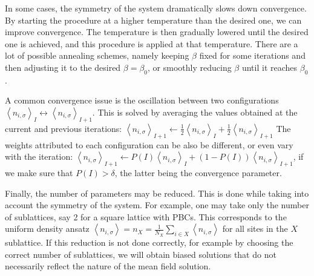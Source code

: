 In some cases, the symmetry of the system dramatically slows down convergence.
By starting the procedure at a higher temperature than the desired one, we can improve convergence.
The temperature is then gradually lowered until the desired one is achieved, and this procedure is applied at that temperature.
There are a lot of possible annealing schemes, namely keeping $\beta$ fixed for some iterations and then adjusting it to the desired $\beta = \beta_0$, or smoothly reducing $\beta$ until it reaches $\beta_0$.

A common convergence issue is the oscillation between two configurations $\left\langle n_{i,\sigma}\right\rangle_I \leftrightarrow \left\langle n_{i,\sigma}\right\rangle_{I+1}$.
This is solved by averaging the values obtained at the current and previous iterations: $\left\langle n_{i,\sigma}\right\rangle_{I+1} \leftarrow \frac{1}{2} \left\langle n_{i,\sigma}\right\rangle_I + \frac{1}{2} \left\langle n_{i,\sigma}\right\rangle_{I+1}$
The weights attributed to each configuration can be also be different, or even vary with the iteration: $\left\langle n_{i,\sigma}\right\rangle_{I+1} \leftarrow P(I) \left\langle n_{i,\sigma}\right\rangle_I + (1 - P(I) ) \left\langle n_{i,\sigma}\right\rangle_{I+1}$, if we make sure that $P(I) > \delta$, the latter being the convergence parameter.

Finally, the number of parameters may be reduced.
This is done while taking into account the symmetry of the system.
For example, one may take only the number of sublattices, say 2 for a square lattice with \acp{PBC}.
This corresponds to the uniform density ansatz $\left\langle n_{i,\sigma} \right\rangle = n_X = \frac{1}{N_X} \sum_{i \in X} \left\langle n_{i,\sigma} \right\rangle$ for all sites in the $X$ sublattice.
If this reduction is not done correctly, for example by choosing the correct number of sublattices, we will obtain biased solutions that do not necessarily reflect the nature of the mean field solution.
